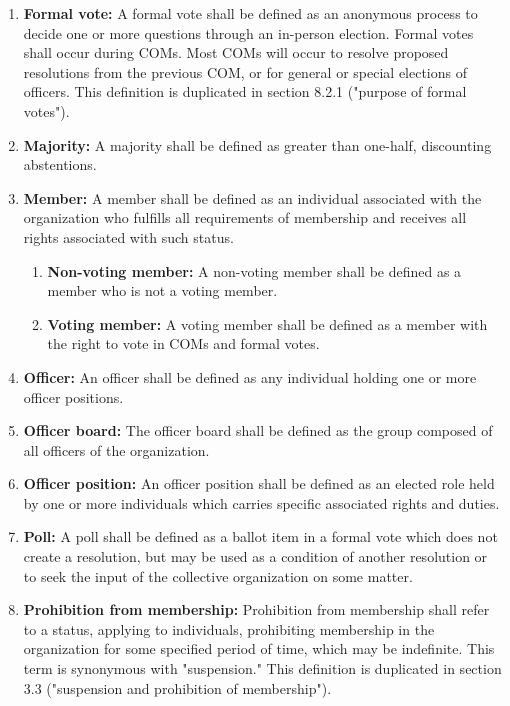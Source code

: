 \documentclass[11pt]{article}
\newcounter{h1}
\newcounter{h2}[h1]
\newcounter{h3}[h2]
\begin{document}
\begin{enumerate}
  \begin{enumerate}
    \item \textbf{General election:} A general election shall be defined as a semesterly election which shall fill all officer positions.
    \item \textbf{Special election:} A special election shall be defined as an irregularly scheduled election which shall fill one or more vacant officer positions.
  \end{enumerate}
  \item \textbf{Formal vote:} A formal vote shall be defined as an anonymous process to decide one or more questions through an in-person election. Formal votes shall occur during COMs. Most COMs will occur to resolve proposed resolutions from the previous COM, or for general or special elections of officers. This definition is duplicated in section 8.2.1 ("purpose of formal votes").
  \item \textbf{Majority:} A majority shall be defined as greater than one-half, discounting abstentions.
  \item \textbf{Member:} A member shall be defined as an individual associated with the organization who fulfills all requirements of membership and receives all rights associated with such status.
  \begin{enumerate}
    \item \textbf{Non-voting member:} A non-voting member shall be defined as a member who is not a voting member.
    \item \textbf{Voting member:} A voting member shall be defined as a member with the right to vote in COMs and formal votes.
  \end{enumerate}
  \item \textbf{Officer:} An officer shall be defined as any individual holding one or more officer positions.
  \item \textbf{Officer board:} The officer board shall be defined as the group composed of all officers of the organization.
  \item \textbf{Officer position:} An officer position shall be defined as an elected role held by one or more individuals which carries specific associated rights and duties.
  \item \textbf{Poll:} A poll shall be defined as a ballot item in a formal vote which does not create a resolution, but may be used as a condition of another resolution or to seek the input of the collective organization on some matter.
  \item \textbf{Prohibition from membership:} Prohibition from membership shall refer to a status, applying to individuals, prohibiting membership in the organization for some specified period of time, which may be indefinite. This term is synonymous with "suspension." This definition is duplicated in section 3.3 ("suspension and prohibition of membership").

\end{enumerate}
\end{document}
